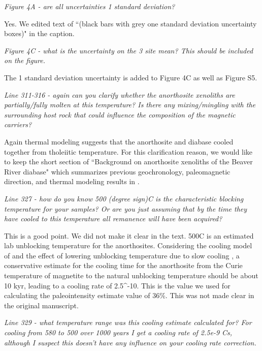 \documentclass[11pt, letterpaper]{article}
\begin{document}
\begin{flushleft}
\textit{Figure 4A - are all uncertainties 1 standard deviation?}

Yes. We edited text of ``(black bars with grey one standard deviation uncertainty boxes)" in the caption.

\textit{Figure 4C - what is the uncertainty on the 3 site mean? This should be included on the figure.}

The 1 standard deviation uncertainty is added to Figure 4C as well as Figure S5.

\textit{Line 311-316 - again can you clarify whether the anorthosite xenoliths are partially/fully molten at this temperature? Is there any mixing/mingling with the surrounding host rock that could influence the composition of the magnetic carriers?}

Again thermal modeling suggests that the anorthosite and diabase cooled together from tholeiitic temperature. For this clarification reason, we would like to keep the short section of ``Background on anorthosite xenoliths of the Beaver River diabase" which summarizes previous geochronology, paleomagnetic direction, and thermal modeling results in \cite{Zhang2021b}. 

\textit{Line 327 - how do you know 500 (degree sign)C is the characteristic blocking temperature for your samples? Or are you just assuming that by the time they have cooled to this temperature all remanence will have been acquired?}

This is a good point. We did not make it clear in the text. 500\textdegree C is an estimated lab unblocking temperature for the anorthosites. Considering the cooling model of \cite{Zhang2021a} and the effect of lowering unblocking temperature due to slow cooling \cite{Halgedahl1980a}, a conservative estimate for the cooling time for the anorthosite from the Curie temperature of magnetite to the natural unblocking temperature should be about 10 kyr, leading to a cooling rate of 2.5^{-10}. This is the value we used for calculating the paleointensity estimate value of 36\%. This was not made clear in the original manuscript.

\textit{Line 329 - what temperature range was this cooling estimate calculated for? For cooling from 580 to 500 over 1000 years I get a cooling rate of 2.5e-9 C\/s, although I suspect this doesn't have any influence on your cooling rate correction.}


\end{flushleft}
\end{document}

